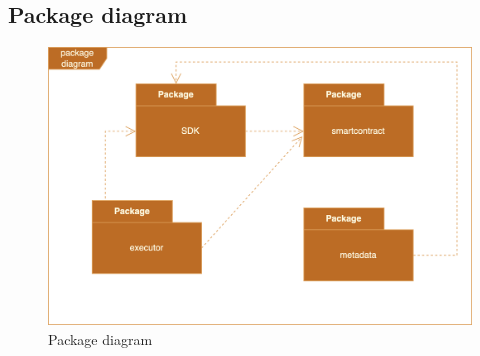 \documentclass[../Main.tex]{subfiles}
\begin{document}
\subsection{Package diagram}

\begin{figure}[H]
 \centering
 \includegraphics[scale=0.17]{Figure/package-diagram.png}
 \caption{Package diagram}
    \label{fig:package-diagram}
\end{figure}
\end{document}
